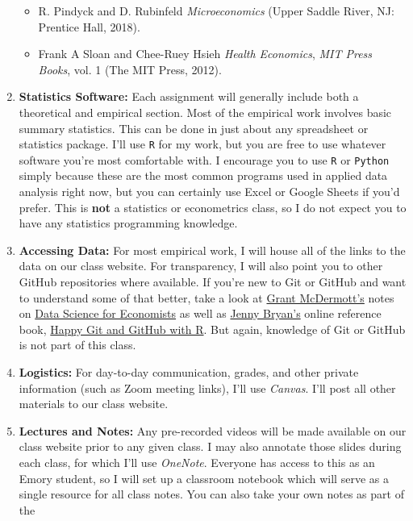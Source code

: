 \documentclass[11pt,]{article}
\providecommand{\tightlist}{%
  \setlength{\itemsep}{0pt}\setlength{\parskip}{0pt}}
\begin{document}
\begin{enumerate}
  \begin{itemize}
  \tightlist
  \item
    R. Pindyck and D. Rubinfeld \emph{Microeconomics} (Upper Saddle
    River, NJ: Prentice Hall, 2018).
  \item
    Frank A Sloan and Chee-Ruey Hsieh \emph{Health Economics}, \emph{MIT
    Press Books}, vol. 1 (The MIT Press, 2012).
  \end{itemize}
\item
  \textbf{Statistics Software:} Each assignment will generally include
  both a theoretical and empirical section. Most of the empirical work
  involves basic summary statistics. This can be done in just about any
  spreadsheet or statistics package. I'll use \texttt{R} for my work,
  but you are free to use whatever software you're most comfortable
  with. I encourage you to use \texttt{R} or \texttt{Python} simply
  because these are the most common programs used in applied data
  analysis right now, but you can certainly use Excel or Google Sheets
  if you'd prefer. This is \textbf{not} a statistics or econometrics
  class, so I do not expect you to have any statistics programming
  knowledge.
\item
  \textbf{Accessing Data:} For most empirical work, I will house all of
  the links to the data on our class website. For transparency, I will
  also point you to other GitHub repositories where available. If you're
  new to Git or GitHub and want to understand some of that better, take
  a look at \href{https://grantmcdermott.com/}{Grant McDermott's} notes
  on \href{https://github.com/uo-ec607/lectures}{Data Science for
  Economists} as well as \href{https://jennybryan.org/}{Jenny Bryan's}
  online reference book, \href{https://happygitwithr.com/}{Happy Git and
  GitHub with R}. But again, knowledge of Git or GitHub is not part of
  this class.
\item
  \textbf{Logistics:} For day-to-day communication, grades, and other
  private information (such as Zoom meeting links), I'll use
  \emph{Canvas}. I'll post all other materials to our class website.
\item
  \textbf{Lectures and Notes:} Any pre-recorded videos will be made
  available on our class website prior to any given class. I may also
  annotate those slides during each class, for which I'll use
  \emph{OneNote}. Everyone has access to this as an Emory student, so I
  will set up a classroom notebook which will serve as a single resource
  for all class notes. You can also take your own notes as part of the

\end{enumerate}
\end{document}
